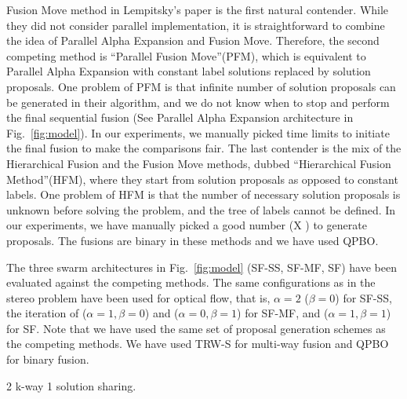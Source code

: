 \noindent Fusion Move method in Lempitsky's paper is the first natural
contender. While they did not consider parallel implementation, it is
straightforward to combine the idea of Parallel Alpha Expansion and
Fusion Move. Therefore, the second competing method is ``Parallel Fusion
Move''(PFM), which is equivalent to Parallel Alpha Expansion with constant
label solutions replaced by solution proposals.
%
One problem of PFM is that infinite number of solution proposals can be
generated in their algorithm, and we do not know when to stop and
perform the final sequential fusion (See Parallel Alpha Expansion
architecture in Fig.~\ref{fig:model}). In our experiments, we manually
picked time limits to initiate the final fusion to make the comparisons
fair.
%
The last contender is the mix of the Hierarchical Fusion and the Fusion
Move methods, dubbed ``Hierarchical Fusion Method''(HFM), where they
start from solution proposals as opposed to constant labels. One problem
of HFM is that the number of necessary solution proposals is unknown
before solving the problem, and the tree of labels cannot be defined. In
our experiments, we have manually picked a good number (X )  to generate proposals.
%
The fusions are binary in these methods and we have used QPBO.


\noindent
The three swarm architectures in Fig.~\ref{fig:model} (SF-SS, SF-MF, SF)
have been evaluated against the competing methods. The same
configurations as in the stereo problem have been used for optical flow,
that is, $\alpha=2$ ($\beta=0$) for SF-SS, the iteration of
($\alpha=1, \beta=0$) and ($\alpha=0, \beta=1$) for SF-MF, and
($\alpha=1, \beta=1$)  for SF.
%
Note that we have used the same set of proposal generation schemes as
the competing methods. We have used TRW-S for multi-way fusion and QPBO
for binary fusion. 
%

2 k-way 1 solution sharing. 
